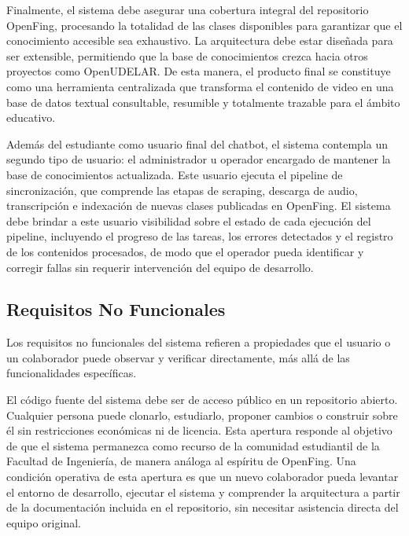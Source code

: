 Finalmente, el sistema debe asegurar una cobertura integral del repositorio OpenFing, procesando la totalidad de las clases disponibles para garantizar que el conocimiento accesible sea exhaustivo. La arquitectura debe estar diseñada para ser extensible, permitiendo que la base de conocimientos crezca hacia otros proyectos como OpenUDELAR. De esta manera, el producto final se constituye como una herramienta centralizada que transforma el contenido de video en una base de datos textual consultable, resumible y totalmente trazable para el ámbito educativo.

Además del estudiante como usuario final del chatbot, el sistema contempla un segundo tipo de usuario: el administrador u operador encargado de mantener la base de conocimientos actualizada. Este usuario ejecuta el pipeline de sincronización, que comprende las etapas de scraping, descarga de audio, transcripción e indexación de nuevas clases publicadas en OpenFing. El sistema debe brindar a este usuario visibilidad sobre el estado de cada ejecución del pipeline, incluyendo el progreso de las tareas, los errores detectados y el registro de los contenidos procesados, de modo que el operador pueda identificar y corregir fallas sin requerir intervención del equipo de desarrollo.

\subsection{Requisitos No Funcionales}
\label{subsection:3-Requisitos No Funcionales}

Los requisitos no funcionales del sistema refieren a propiedades que el usuario o un colaborador puede observar y verificar directamente, más allá de las funcionalidades específicas.

El código fuente del sistema debe ser de acceso público en un repositorio abierto. Cualquier persona puede clonarlo, estudiarlo, proponer cambios o construir sobre él sin restricciones económicas ni de licencia. Esta apertura responde al objetivo de que el sistema permanezca como recurso de la comunidad estudiantil de la Facultad de Ingeniería, de manera análoga al espíritu de OpenFing. Una condición operativa de esta apertura es que un nuevo colaborador pueda levantar el entorno de desarrollo, ejecutar el sistema y comprender la arquitectura a partir de la documentación incluida en el repositorio, sin necesitar asistencia directa del equipo original.

